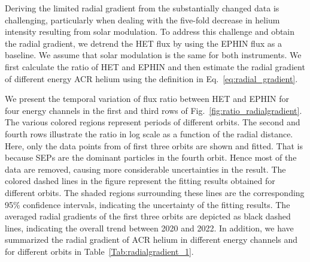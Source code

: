 Deriving the limited radial gradient from the substantially changed data is challenging, particularly when dealing with the five-fold decrease in helium intensity resulting from solar modulation.
To address this challenge and obtain the radial gradient, we detrend the \ac{HET} flux by using the \ac{EPHIN} flux as a baseline. We assume that solar modulation is the same for both instruments. We first calculate the ratio of \ac{HET} and \ac{EPHIN} and then estimate the radial gradient of different energy \ac{ACR} helium using the definition in Eq.~\ref{eq:radial_gradient}.

We present the temporal variation of flux ratio between \ac{HET} and \ac{EPHIN} for four energy channels in the first and third rows of Fig.~\ref{fig:ratio_radialgradient}. The various colored regions represent periods of different orbits. The second and fourth rows illustrate the ratio in log scale as a function of the radial distance. Here, only the data points from of first three orbits are shown and fitted. That is because \acp{SEP} are the dominant particles in the fourth orbit. Hence most of the data are removed, causing more considerable uncertainties in the result. The colored dashed lines in the figure represent the fitting results obtained for different orbits. The shaded regions surrounding these lines are the corresponding 95\% confidence intervals,  indicating the uncertainty of the fitting results. The averaged radial gradients of the first three orbits are depicted as black dashed lines, indicating the overall trend between 2020 and 2022.
In addition, we have summarized the radial gradient of \ac{ACR} helium in different energy channels and for different orbits in Table~\ref{Tab:radialgradient_1}.

